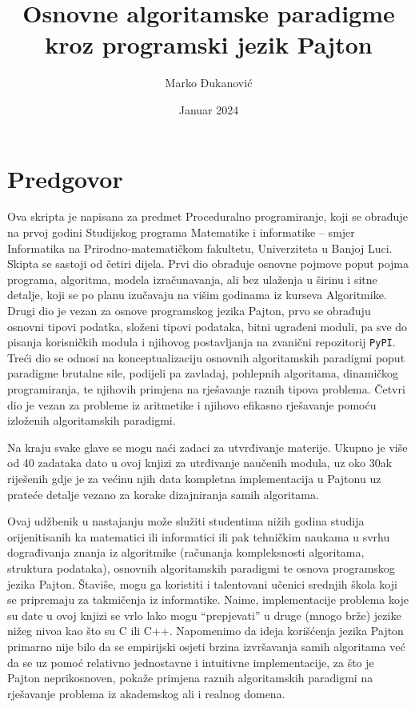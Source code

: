 \documentclass[b4paper,12pt]{book}
\begin{document}
\author{Marko Đukanović}
\title{Osnovne algoritamske paradigme kroz programski jezik Pajton}
\date{Januar 2024}

 
\maketitle
 
\tableofcontents
 \clearpage
 \setcounter{page}{1}

\chapter*{Predgovor}

Ova skripta je napisana za predmet Proceduralno programiranje, koji se obrađuje na prvoj godini Studijskog programa Matematike i informatike -- smjer Informatika na Prirodno-matematičkom fakultetu, Univerziteta u Banjoj Luci. Skipta se sastoji od četiri dijela. Prvi dio obrađuje osnovne pojmove poput pojma programa, algoritma, modela izraču\-navanja, ali bez ulaženja u širinu i sitne detalje, koji se po planu izučavaju na višim godinama iz kurseva Algoritmike. Drugi dio je vezan za osnove programskog jezika Pajton, prvo se obrađuju  osnovni tipovi podatka, složeni tipovi podataka, bitni ugrađeni moduli, pa sve do pisanja korisničkih modula i njihovog postavljanja na zvanični repozitorij \texttt{PyPI}. Treći dio se odnosi na konceptualizaciju osnovnih algoritamskih paradigmi poput paradigme brutalne sile, podijeli pa zavladaj, pohlepnih algoritama, dinamičkog programiranja, te njihovih primjena na rješavanje raznih tipova problema. Četvri dio je vezan za probleme iz aritmetike i njihovo efikasno rješavanje pomoću izloženih algoritamskih paradigmi. 

 Na kraju svake glave se mogu naći zadaci za utvrđivanje materije. Ukupno je više od 40 zadataka dato u ovoj knjizi za utrđivanje naučenih modula, uz oko 30ak riješenih gdje je za većinu njih data kompletna implementacija u Pajtonu uz prateće detalje vezano za korake dizajniranja samih algoritama. 
 
 
 Ovaj udžbenik u nastajanju može služiti studentima nižih godina studija orijenitisanih ka matematici ili informatici ili pak tehničkim naukama u svrhu dograđivanja znanja iz algoritmike (računanja kompleksnosti algoritama, struktura podataka), osnovnih algoritamskih paradigmi te osnova programskog jezika Pajton. Štaviše, mogu ga koristiti i talentovani učenici srednjih škola koji se pripremaju za takmičenja iz informatike. Naime, implementacije problema koje su date u ovoj knjizi se vrlo lako mogu ``prepjevati'' u druge (mnogo brže) jezike nižeg nivoa kao što su C ili C++. Napomenimo da ideja korišćenja jezika Pajton primarno nije bilo da se empirijski osjeti brzina izvršavanja samih algoritama već da se uz pomoć relativno jednostavne i intuitivne implementacije, za što je Pajton neprikosnoven, pokaže primjena raznih algoritamskih paradigmi na rješavanje problema iz akademskog ali i realnog domena.
\end{document}
